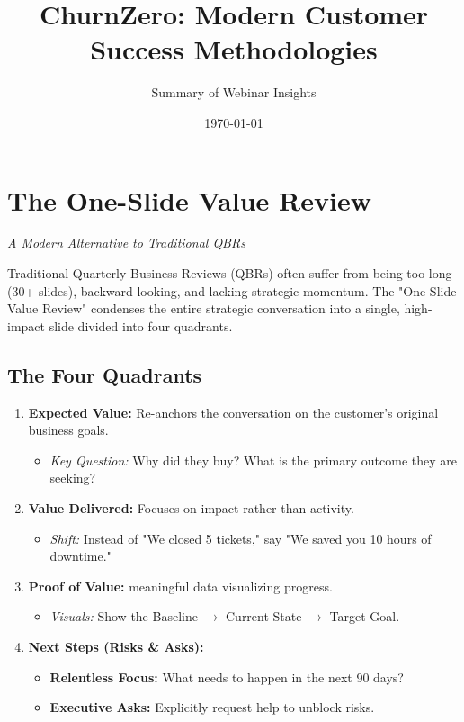 \documentclass[12pt,a4paper]{article}
\title{\textbf{ChurnZero: Modern Customer Success Methodologies}}
\author{Summary of Webinar Insights}
\date{\today}
\begin{document}
\maketitle

\section{The One-Slide Value Review}
\textit{A Modern Alternative to Traditional QBRs}

Traditional Quarterly Business Reviews (QBRs) often suffer from being too long (30+ slides), backward-looking, and lacking strategic momentum. The "One-Slide Value Review" condenses the entire strategic conversation into a single, high-impact slide divided into four quadrants.

\subsection{The Four Quadrants}
\begin{enumerate}
    \item \textbf{Expected Value:} Re-anchors the conversation on the customer's original business goals.
    \begin{itemize}
        \item \textit{Key Question:} Why did they buy? What is the primary outcome they are seeking?
    \end{itemize}
    
    \item \textbf{Value Delivered:} Focuses on impact rather than activity.
    \begin{itemize}
        \item \textit{Shift:} Instead of "We closed 5 tickets," say "We saved you 10 hours of downtime."
    \end{itemize}
    
    \item \textbf{Proof of Value:} meaningful data visualizing progress.
    \begin{itemize}
        \item \textit{Visuals:} Show the Baseline $\rightarrow$ Current State $\rightarrow$ Target Goal.
    \end{itemize}
    
    \item \textbf{Next Steps (Risks \& Asks):}
    \begin{itemize}
        \item \textbf{Relentless Focus:} What needs to happen in the next 90 days?
        \item \textbf{Executive Asks:} Explicitly request help to unblock risks.
    \end{itemize}
\end{enumerate}
\end{document}

